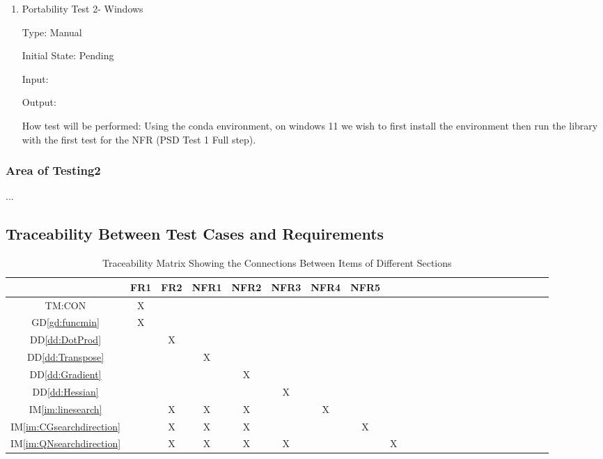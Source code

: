 \documentclass[12pt, titlepage]{article}
\begin{document}
\begin{enumerate}
\item{Portability Test 2- Windows\\}

Type: Manual 
					
Initial State: Pending
					
Input: 
					
Output: 
					
How test will be performed: Using the conda environment, on windows 11
we wish to first install the environment then run the library with the first test for the 
NFR (PSD Test 1 Full step).

\end{enumerate}

\subsubsection{Area of Testing2}

...

\subsection{Traceability Between Test Cases and Requirements}
\begin{table}[h!]
  \centering
  \begin{tabular}{|c|c|c|c|c|c|c|c|c|c|c|c|c|c|c|c|c|c|c|c|c|c|c|c|}
  \hline        
    & FR1& FR2 & NFR1 & NFR2& NFR3 & NFR4& NFR5\\
  \hline
  TM:CON                    &X & & & & & & &  \\ \hline
  GD\ref{gd:funcmin}        &X & & & & & & &  \\ \hline
  DD\ref{dd:DotProd}      & &X & & & & & &  \\ \hline
  DD\ref{dd:Transpose} & & &X & & & & &  \\ \hline
  DD\ref{dd:Gradient}  & & & &X & & & &  \\ \hline
  DD\ref{dd:Hessian}    & & & & & X& & &  \\ \hline
  IM\ref{im:linesearch}     & &X &X &X & &X & &  \\ \hline
  IM\ref{im:CGsearchdirection}      & &X &X &X & & & X&  \\ \hline
  IM\ref{im:QNsearchdirection}      & &X &X &X &X & & &X  \\ \hline
  
  \end{tabular}
  \caption{Traceability Matrix Showing the Connections Between Items of Different Sections}
  \label{Table:trace}
  \end{table}
\end{document}
